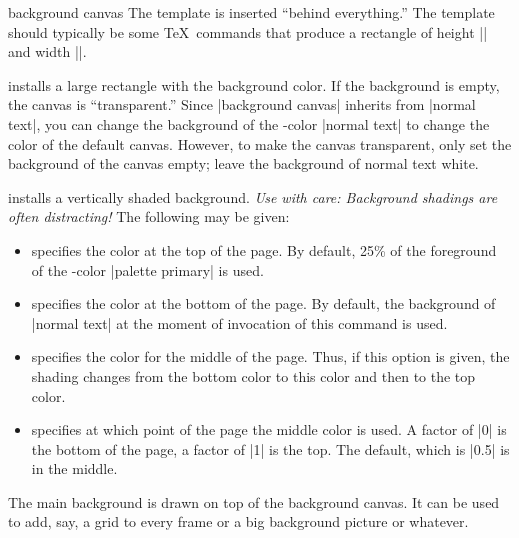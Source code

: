 \begin{element}{background canvas}\yes\yes\yes
  The template is inserted ``behind everything.'' The template should
  typically be some \TeX\ commands that produce a rectangle of height
  |\paperheight| and width |\paperwidth|.

  \begin{templateoptions}
    installs a large rectangle with the background color. If the
    background is empty, the canvas is ``transparent.'' Since
    |background canvas| inherits from |normal text|, you can change the
    background of the \beamer-color |normal text| to change the
    color of the default canvas. However, to make the canvas
    transparent, only set the background of the canvas empty; leave
    the background of normal text white.

    installs a vertically shaded background. \emph{Use with care:
      Background shadings are often distracting!} The following
     may be given:
    \begin{itemize}
    \item {} specifies the color at the
      top of the page. By default, 25\% of the foreground of the
      \beamer-color |palette primary| is used.
    \item {} specifies the color at the
      bottom of the page. By default, the background of
      |normal text| at the moment of invocation of this command is
      used.
    \item {} specifies the color
      for the middle of the page. Thus, if this option is given, the
      shading changes from the bottom color to this color and then
      to the top color.
    \item {} specifies at which
      point of the page the middle color is used. A factor of |0| is
      the bottom of the page, a factor of |1| is the top. The
      default, which is |0.5| is in the middle.
    \end{itemize}
  \end{templateoptions}
\end{element}

The main background is drawn on top of the background canvas. It can
be used to add, say, a grid to every frame or a big background picture
or whatever.

